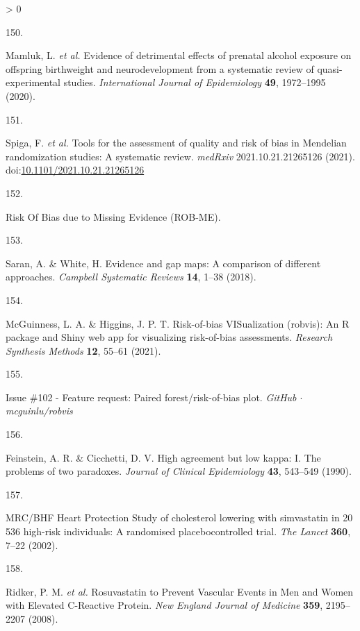 \documentclass[a4paper, twoside]{templates/ociamthesis}
\newlength{\cslhangindent}
\newlength{\csllabelwidth}
\newenvironment{CSLReferences}[3] %
 {%
  \setlength{\parindent}{0pt}
  \ifodd #1 \everypar{\setlength{\hangindent}{\cslhangindent}}\ignorespaces\fi
  \ifnum #2 > 0
  \setlength{\parskip}{#2\baselineskip}
  \fi
 }%
 {}
\newcommand{\CSLLeftMargin}[1]{\parbox[t]{\maxof{\widthof{#1}}{\csllabelwidth}}{#1}}
\newcommand{\CSLRightInline}[1]{\parbox[t]{\linewidth - \csllabelwidth}{#1}}
\begin{document}
\begin{CSLReferences}{0}{0}
\leavevmode\hypertarget{ref-mamluk2020}{}%
\CSLLeftMargin{150. }
\CSLRightInline{Mamluk, L. \emph{et al.} Evidence of detrimental effects of prenatal alcohol exposure on offspring birthweight and neurodevelopment from a systematic review of quasi-experimental studies. \emph{International Journal of Epidemiology} \textbf{49}, 1972--1995 (2020).}

\leavevmode\hypertarget{ref-spiga2021}{}%
\CSLLeftMargin{151. }
\CSLRightInline{Spiga, F. \emph{et al.} Tools for the assessment of quality and risk of bias in {Mendelian} randomization studies: A systematic review. \emph{medRxiv} 2021.10.21.21265126 (2021). doi:\href{https://doi.org/10.1101/2021.10.21.21265126}{10.1101/2021.10.21.21265126}}

\leavevmode\hypertarget{ref-zotero-15123}{}%
\CSLLeftMargin{152. }
\CSLRightInline{Risk {Of Bias} due to {Missing Evidence} ({ROB}-{ME}).}

\leavevmode\hypertarget{ref-saran2018}{}%
\CSLLeftMargin{153. }
\CSLRightInline{Saran, A. \& White, H. Evidence and gap maps: A comparison of different approaches. \emph{Campbell Systematic Reviews} \textbf{14}, 1--38 (2018).}

\leavevmode\hypertarget{ref-mcguinness2020robvisPaper}{}%
\CSLLeftMargin{154. }
\CSLRightInline{McGuinness, L. A. \& Higgins, J. P. T. Risk-of-bias {VISualization} (robvis): An {R} package and {Shiny} web app for visualizing risk-of-bias assessments. \emph{Research Synthesis Methods} \textbf{12}, 55--61 (2021).}

\leavevmode\hypertarget{ref-zotero-14999}{}%
\CSLLeftMargin{155. }
\CSLRightInline{Issue \#102 - {Feature} request: Paired forest/risk-of-bias plot. \emph{GitHub {\(\cdot\)} mcguinlu/robvis}}

\leavevmode\hypertarget{ref-feinstein1990}{}%
\CSLLeftMargin{156. }
\CSLRightInline{Feinstein, A. R. \& Cicchetti, D. V. High agreement but low kappa: I. {The} problems of two paradoxes. \emph{Journal of Clinical Epidemiology} \textbf{43}, 543--549 (1990).}

\leavevmode\hypertarget{ref-heartprotectionstudycollaborativegroup2002}{}%
\CSLLeftMargin{157. }
\CSLRightInline{{MRC}/{BHF Heart Protection Study} of cholesterol lowering with simvastatin in 20 536 high-risk individuals: A randomised placebocontrolled trial. \emph{The Lancet} \textbf{360}, 7--22 (2002).}

\leavevmode\hypertarget{ref-ridker2008}{}%
\CSLLeftMargin{158. }
\CSLRightInline{Ridker, P. M. \emph{et al.} Rosuvastatin to {Prevent Vascular Events} in {Men} and {Women} with {Elevated C}-{Reactive Protein}. \emph{New England Journal of Medicine} \textbf{359}, 2195--2207 (2008).}


\end{CSLReferences}
\end{document}
